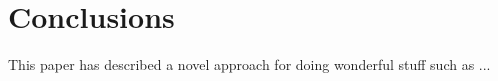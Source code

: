 \section{Conclusions}

This paper has described a novel approach for doing wonderful stuff such as ...